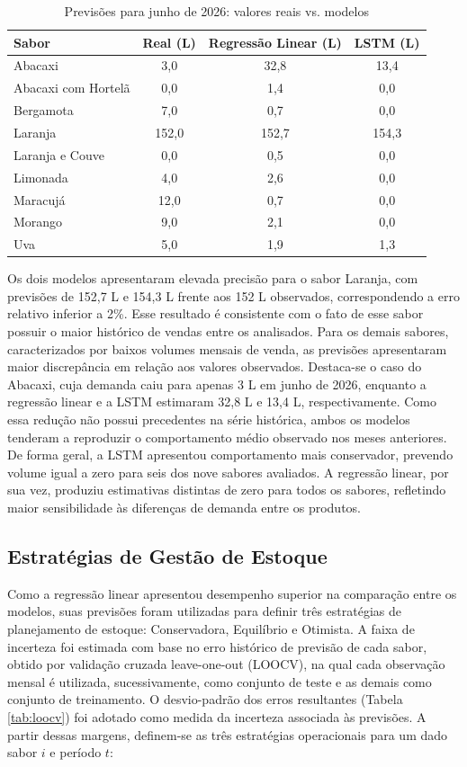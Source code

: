 \begin{table} [htpb]
\centering
\caption{Previsões para junho de 2026: valores reais vs. modelos}
\label{tab:predjun2026} 
\begin{tabular}{p{3.6cm}ccc} \hline
\textbf{Sabor} & \textbf{Real (L)} & \textbf{Regressão Linear (L)} & \textbf{LSTM (L)} \\ \hline
Abacaxi & 	3,0 & 32,8 & 	13,4\\ 
Abacaxi com Hortelã & 	0,0 & 1,4 & 0,0\\ 
Bergamota & 7,0 & 0,7 & 0,0\\  
Laranja & 152,0 & 152,7 & 154,3\\ 
Laranja e Couve & 	0,0 & 0,5 & 0,0\\ 
Limonada & 4,0 & 2,6 & 0,0\\ 
Maracujá & 12,0 & 0,7 & 0,0\\ 
Morango & 9,0 & 2,1 & 0,0\\ 
Uva & 	5,0 & 1,9 & 1,3\\ \hline
\end{tabular}
\end{table}

Os dois modelos apresentaram elevada precisão para o sabor Laranja, com previsões de 152,7 L e 154,3 L frente aos 152 L observados, correspondendo a erro relativo inferior a 2\%. Esse resultado é consistente com o fato de esse sabor possuir o maior histórico de vendas entre os analisados. Para os demais sabores, caracterizados por baixos volumes mensais de venda, as previsões apresentaram maior discrepância em relação aos valores observados. Destaca-se o caso do Abacaxi, cuja demanda caiu para apenas 3 L em junho de 2026, enquanto a regressão linear e a LSTM estimaram 32,8 L e 13,4 L, respectivamente. Como essa redução não possui precedentes na série histórica, ambos os modelos tenderam a reproduzir o comportamento médio observado nos meses anteriores. De forma geral, a LSTM apresentou comportamento mais conservador, prevendo volume igual a zero para seis dos nove sabores avaliados. A regressão linear, por sua vez, produziu estimativas distintas de zero para todos os sabores, refletindo maior sensibilidade às diferenças de demanda entre os produtos.

\subsection{Estratégias de Gestão de Estoque}

Como a regressão linear apresentou desempenho superior na comparação entre os modelos, suas previsões foram utilizadas para definir três estratégias de planejamento de estoque: Conservadora, Equilíbrio e Otimista. A faixa de incerteza foi estimada com base no erro histórico de previsão de cada sabor, obtido por validação cruzada leave-one-out (LOOCV), na qual cada observação mensal é utilizada, sucessivamente, como conjunto de teste e as demais como conjunto de treinamento. O desvio-padrão dos erros resultantes (Tabela \ref{tab:loocv}) foi adotado como medida da incerteza associada às previsões. A partir dessas margens, definem-se as três estratégias operacionais para um dado sabor $i$ e período $t$:

